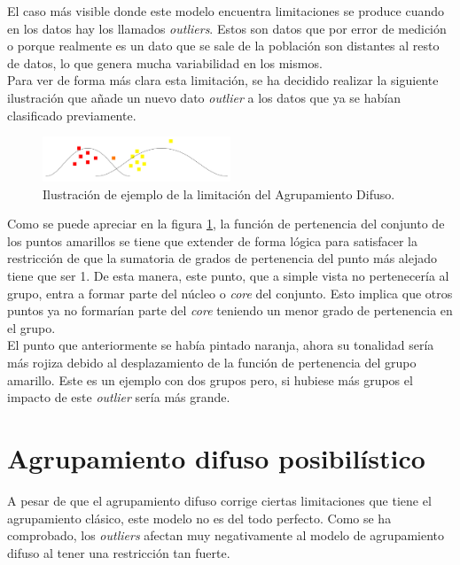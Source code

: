 \documentclass[]{report}
\begin{document}
			El caso más visible donde este modelo encuentra limitaciones se produce cuando en los datos hay los llamados \textit{outliers}. Estos son datos que por error de medición o porque realmente es un dato que se sale de la población son distantes al resto de datos, lo que genera mucha variabilidad en los mismos.\\
			
			Para ver de forma más clara esta limitación, se ha decidido realizar la siguiente ilustración que añade un nuevo dato \textit{outlier} a los datos que ya se habían clasificado previamente.
			
			\begin{figure}[h!]
				\centering
				\includegraphics[width=0.5\textwidth]{problema-agrupamiento-difuso.jpg}
				\caption{Ilustración de ejemplo de la limitación del Agrupamiento Difuso.}
				\label{clustering_difuso_problema}
			\end{figure}
			
			Como se puede apreciar en la figura \ref{clustering_difuso_problema}, la función de pertenencia del conjunto de los puntos amarillos se tiene que extender de forma lógica para satisfacer la restricción de que la sumatoria de grados de pertenencia del punto más alejado tiene que ser 1. De esta manera, este punto, que a simple vista no pertenecería al grupo, entra a formar parte del núcleo o \textit{core} del conjunto. Esto implica que otros puntos ya no formarían parte del \textit{core} teniendo un menor grado de pertenencia en el grupo.\\
			
			El punto que anteriormente se había pintado naranja, ahora su tonalidad sería más rojiza debido al desplazamiento de la función de pertenencia del grupo amarillo. Este es un ejemplo con dos grupos pero, si hubiese más grupos el impacto de este \textit{outlier} sería más grande.
	
	\chapter{Agrupamiento difuso posibilístico}
	
		A pesar de que el agrupamiento difuso corrige ciertas limitaciones que tiene el agrupamiento clásico, este modelo no es del todo perfecto. Como se ha comprobado, los \textit{outliers} afectan muy negativamente al modelo de agrupamiento difuso al tener una restricción tan fuerte.\\
		
\end{document}
